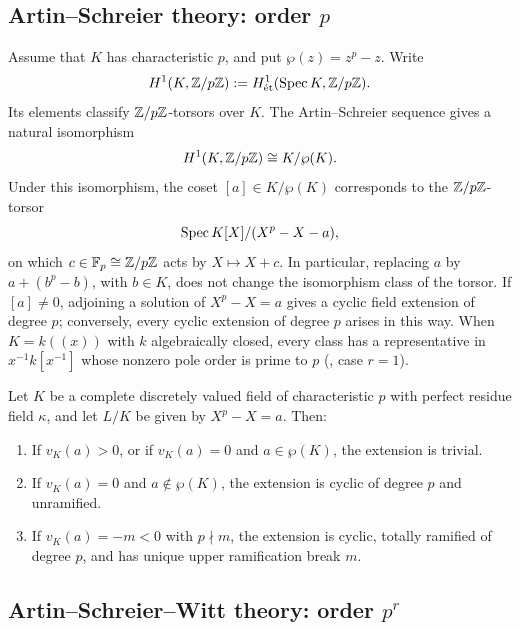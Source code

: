 \subsection{Artin--Schreier theory: order \texorpdfstring{$p$}{p}}

Assume that $K$ has characteristic $p$, and put $\wp(z)=z^p-z$. Write
\[
H^1(K,\mathbb{Z}/p\mathbb{Z}):=H^1_{\mathrm{\acute et}}(\operatorname{Spec} K,\mathbb{Z}/p\mathbb{Z}).
\]
Its elements classify $\mathbb{Z}/p\mathbb{Z}$-torsors over $K$. The Artin--Schreier
sequence gives a natural isomorphism
\[
H^1(K,\mathbb{Z}/p\mathbb{Z})\cong K/\wp(K).
\]
Under this isomorphism, the coset $[a]\in K/\wp(K)$ corresponds to the
$\mathbb{Z}/p\mathbb{Z}$-torsor
\[
\operatorname{Spec} K[X]/(X^p-X-a),
\]
on which $c\in\mathbb{F}_p\cong\mathbb{Z}/p\mathbb{Z}$ acts by $X\mapsto X+c$. In particular,
replacing $a$ by $a+(b^p-b)$, with $b\in K$, does not change the
isomorphism class of the torsor. If $[a]\neq0$, adjoining a solution of
$X^p-X=a$ gives a cyclic field extension of degree $p$; conversely, every
cyclic extension of degree $p$ arises in this way. When $K=k((x))$ with
$k$ algebraically closed, every class has a representative in
$x^{-1}k[x^{-1}]$ whose nonzero pole order is prime to $p$
(, case $r=1$).

\begin{theorem}
\label{theorem:artin_schreier_ramification}
Let $K$ be a complete discretely valued field of characteristic $p$ with
perfect residue field $\kappa$, and let $L/K$ be given by $X^p-X=a$. Then:
\begin{enumerate}
    \item If $v_K(a)>0$, or if $v_K(a)=0$ and $a\in\wp(K)$, the extension
    is trivial.
    \item If $v_K(a)=0$ and $a\notin\wp(K)$, the extension is cyclic of
    degree $p$ and unramified.
    \item If $v_K(a)=-m<0$ with $p\nmid m$, the extension is cyclic,
    totally ramified of degree $p$, and has unique upper ramification break
    $m$.
\end{enumerate}
\end{theorem}

\subsection{Artin--Schreier--Witt theory: order
\texorpdfstring{$p^r$}{p-power}}
\label{subsection:witt_vector_prerequisites}

